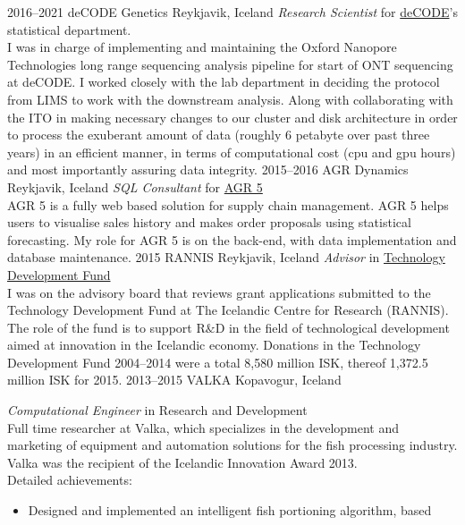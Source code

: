 \documentclass[]{cv} %
\begin{document}
\begin{entrylist}
\entry
{2016--2021}
{deCODE Genetics}
{Reykjavik, Iceland}
{\emph{Research Scientist} for
    \href{https://www.decode.com/}{deCODE}'s statistical department.\\
    I was in charge of implementing and maintaining the Oxford Nanopore Technologies long range sequencing analysis pipeline for start of ONT sequencing at deCODE. 
    I worked closely with the lab department in deciding the protocol from LIMS to work with the downstream analysis. Along with collaborating with the ITO in making necessary changes to our cluster and disk architecture in order to process the exuberant amount of data (roughly 6 petabyte over past three years) in an efficient manner, in terms of computational cost (cpu and gpu hours) and most importantly assuring data integrity. 
}
\entry
{2015--2016}
{AGR Dynamics}
{Reykjavik, Iceland}
{\emph{SQL Consultant} for
    \href{http://agrdynamics.com/}{AGR 5}\\
    AGR 5 is a fully web based solution for supply chain management. AGR 5 
    helps users to visualise sales history and makes order proposals using 
    statistical forecasting. My role for AGR 5 is on the back-end, with data 
    implementation and database maintenance.
}    
\entry
{2015}
{RANNIS}
{Reykjavik, Iceland}
{\emph{Advisor} in 
\href{http://www.rannis.is/sjodir/rannsoknir/taeknithrounarsjodur/fagrad/}{Technology
 Development Fund}\\
I was on the advisory board that reviews grant applications submitted to 
the  Technology Development Fund at The Icelandic Centre for Research (RANNIS).
The role of the fund is to support R$\&$D in the field of technological 
development aimed at innovation in the Icelandic economy.
Donations in the Technology Development Fund 2004--2014 were a total 8,580 
million ISK, thereof 1,372.5 million ISK for 2015.
}
\entry
{2013--2015}
{VALKA}
{Kopavogur, Iceland}
{\emph{Computational Engineer} in Research and Development \\
Full time researcher at Valka, which specializes in the development and marketing of equipment and automation solutions for the fish processing industry. Valka was the recipient of the Icelandic Innovation Award 2013. \\
Detailed achievements:
\begin{itemize}
\item Designed and implemented an intelligent fish portioning algorithm, based 

\end{itemize}}
\end{entrylist}
\end{document}
